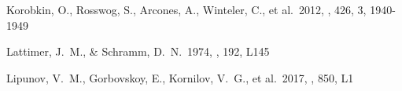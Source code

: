 \documentclass[twocolumn,twocolappendix]{aastex63}
\begin{document}
\begin{thebibliography}{}
 Korobkin, O., Rosswog, S., Arcones, A., Winteler, C., et al.\ 2012, \mnras, 426, 3, 1940-1949



















 Lattimer, J.~M., \& Schramm, D.~N.\ 1974, \apjl, 192, L145








 Lipunov, V.~M., Gorbovskoy, E., Kornilov, V.~G., et al.\ 2017, \apjl, 850, L1



\end{thebibliography}
\end{document}
